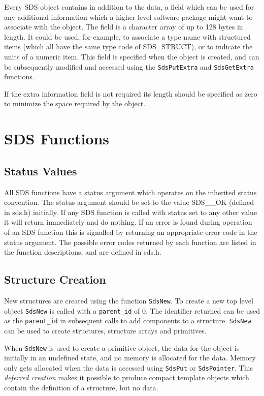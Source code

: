 Every SDS object contains in addition to the data, a field which can be used
for any additional information which a higher level software package might want
to associate with the object. The field is a character array of up to 128 bytes
in length. It could be used, for example, to associate a type name with
structured items (which all have the same type code of SDS\_STRUCT), or to indicate
the units of a numeric item. This field is specified when the object is
created, and can be subsequently modified and accessed using the
\verb$SdsPutExtra$ and \verb$SdsGetExtra$ functions.

If the extra information field is not required its length should be specified
as zero to minimize the space required by the object.

\section{SDS Functions}

\subsection{Status Values}

All SDS functions have a status argument which operates on the inherited status
convention. The status argument should be set to the value SDS\_\_OK (defined
in sds.h) initially. If any SDS function is called with status set to any other
value it will return immediately and do nothing. If an error is found during 
operation of an SDS function this is signalled by returning an appropriate
error code in the status argument. The possible error codes returned by each
function are listed in the function descriptions, and are defined in sds.h.

\subsection{Structure Creation}

New structures are created using the function
\verb$SdsNew$. To create a new top level object \verb$SdsNew$ is called with
a \verb$parent_id$ of 0. The identifier returned can be used as the 
\verb$parent_id$ in 
subsequent calls to add components to a structure. \verb$SdsNew$ can be used to
create structures, structure arrays and primitives.

When \verb$SdsNew$ is used to create a primitive object, the data for the
object is initially in an undefined state, and no memory is allocated for the
data. Memory only gets allocated when the data is accessed using \verb$SdsPut$
or \verb$SdsPointer$. This {\em deferred creation} makes it possible to produce
compact template objects which contain the definition of a structure, but no
data.

